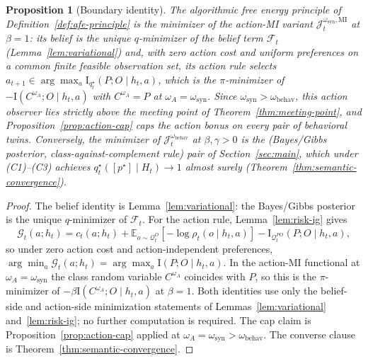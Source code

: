 \documentclass[11pt]{article}
\newtheorem{proposition}[theorem]{Proposition}
\theoremstyle{definition}
\theoremstyle{remark}
\newcommand{\Fcal}{\mathcal{F}}
\newcommand{\Gcal}{\mathcal{G}}
\newcommand{\Qcal}{\mathcal{Q}}
\newcommand{\E}{\mathbb{E}}
\newcommand{\I}{\mathrm{I}}
\begin{document}
\begin{proposition}[Boundary identity]
\label{prop:boundary-identity}
The algorithmic free energy principle of Definition~\ref{def:afe-principle} is the minimizer of the action-MI variant $\mathcal J_t^{\omega_{\mathrm{syn}},\mathrm{MI}}$ at $\beta=1$: its belief is the unique $q$-minimizer of the belief term $\Fcal_t$ (Lemma~\ref{lem:variational}) and, with zero action cost and uniform preferences on a common finite feasible observation set, its action rule selects $a_{t+1}\in\arg\max_a \I_{q_t^\star}(P;O\mid h_t,a)$, which is the $\pi$-minimizer of $-\I(C^{\omega_A};O\mid h_t,a)$ with $C^{\omega_A}=P$ at $\omega_A=\omega_{\mathrm{syn}}$. Since $\omega_{\mathrm{syn}}>\omega_{\mathrm{behav}}$, this action observer lies strictly above the meeting point of Theorem~\ref{thm:meeting-point}, and Proposition~\ref{prop:action-cap} caps the action bonus on every pair of behavioral twins. Conversely, the minimizer of $\mathcal J_t^{\omega_{\mathrm{behav}}}$ at $\beta,\gamma>0$ is the (Bayes/Gibbs posterior, class-against-complement rule) pair of Section~\ref{sec:main}, which under \textup{(C1)--(C3)} achieves $q_t^\star([p^\star]\mid H_t)\to 1$ almost surely (Theorem~\ref{thm:semantic-convergence}).
\end{proposition}

\begin{proof}
The belief identity is Lemma~\ref{lem:variational}: the Bayes/Gibbs posterior is the unique $q$-minimizer of $\Fcal_t$. For the action rule, Lemma~\ref{lem:risk-ig} gives
\[
\Gcal_t(a;h_t)
=
c_t(a;h_t)+\E_{o\sim\Qcal_t^O}[-\log\rho_t(o\mid h_t,a)]-\I_{\Qcal_t^{PO}}(P;O\mid h_t,a),
\]
so under zero action cost and action-independent preferences, $\arg\min_a\Gcal_t(a;h_t)=\arg\max_a\I(P;O\mid h_t,a)$. In the action-MI functional at $\omega_A=\omega_{\mathrm{syn}}$ the class random variable $C^{\omega_A}$ coincides with $P$, so this is the $\pi$-minimizer of $-\beta\I(C^{\omega_A};O\mid h_t,a)$ at $\beta=1$. Both identities use only the belief-side and action-side minimization statements of Lemmas~\ref{lem:variational} and~\ref{lem:risk-ig}; no further computation is required. The cap claim is Proposition~\ref{prop:action-cap} applied at $\omega_A=\omega_{\mathrm{syn}}>\omega_{\mathrm{behav}}$. The converse clause is Theorem~\ref{thm:semantic-convergence}.
\end{proof}
\end{document}
